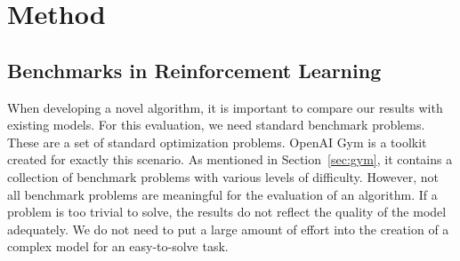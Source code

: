
\chapter{Method}
\label{ch:method}

\section{Benchmarks in Reinforcement Learning}
\label{sec:benchmarks}
When developing a novel algorithm, it is important to compare our results with existing models. For this evaluation, we need standard benchmark problems. These are a set of standard optimization problems. OpenAI Gym is a toolkit created for exactly this scenario. As mentioned in Section~\ref{sec:gym}, it contains a collection of benchmark problems with various levels of difficulty. However, not all benchmark problems are meaningful for the evaluation of an algorithm. If a problem is too trivial to solve, the results do not reflect the quality of the model adequately. We do not need to put a large amount of effort into the creation of a complex model for an easy-to-solve task.

